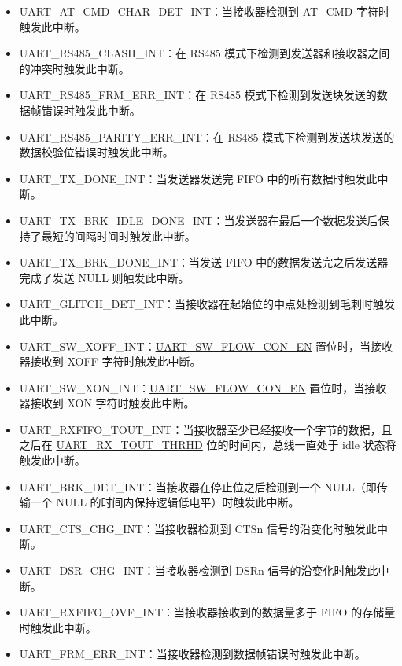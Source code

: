 \documentclass[main\_\_CN.tex]{subfiles}
\begin{document}
\begin{itemize}
\item \label{int:UARTATCMDCHARDETINT}UART\_AT\_CMD\_CHAR\_DET\_INT：当接收器检测到 AT\_CMD 字符时触发此中断。
\item \label{int:UARTRS485CLASHINT}UART\_RS485\_CLASH\_INT：在 RS485 模式下检测到发送器和接收器之间的冲突时触发此中断。
\item \label{int:UARTRS485FRMERRINT}UART\_RS485\_FRM\_ERR\_INT：在 RS485 模式下检测到发送块发送的数据帧错误时触发此中断。
\item \label{int:UARTRS485PARITYERRINT}UART\_RS485\_PARITY\_ERR\_INT：在 RS485 模式下检测到发送块发送的数据校验位错误时触发此中断。
\item \label{int:UARTTXDONEINT}UART\_TX\_DONE\_INT：当发送器发送完 FIFO 中的所有数据时触发此中断。
\item \label{int:UARTTXBRKIDLEDONEINT}UART\_TX\_BRK\_IDLE\_DONE\_INT：当发送器在最后一个数据发送后保持了最短的间隔时间时触发此中断。
\item \label{int:UARTTXBRKDONEINT}UART\_TX\_BRK\_DONE\_INT：当发送 FIFO 中的数据发送完之后发送器完成了发送 NULL 则触发此中断。
\item \label{int:UARTGLITCHDETINT}UART\_GLITCH\_DET\_INT：当接收器在起始位的中点处检测到毛刺时触发此中断。
\item \label{int:UARTSWXOFFINT}UART\_SW\_XOFF\_INT：\hyperref[fielddesc:UARTSWFLOWCONEN]{UART\_SW\_FLOW\_CON\_EN} 置位时，当接收器接收到 XOFF 字符时触发此中断。
\item \label{int:UARTSWXONINT}UART\_SW\_XON\_INT：\hyperref[fielddesc:UARTSWFLOWCONEN]{UART\_SW\_FLOW\_CON\_EN} 置位时，当接收器接收到 XON 字符时触发此中断。
\item \label{int:UARTRXFIFOTOUTINT}UART\_RXFIFO\_TOUT\_INT：当接收器至少已经接收一个字节的数据，且之后在 \hyperref[fielddesc:UARTRXTOUTTHRHD]{UART\_RX\_TOUT\_THRHD} 位的时间内，总线一直处于 idle 状态将触发此中断。
\item \label{int:UARTBRKDETINT}UART\_BRK\_DET\_INT：当接收器在停止位之后检测到一个 NULL（即传输一个 NULL 的时间内保持逻辑低电平）时触发此中断。
\item \label{int:UARTCTSCHGINT}UART\_CTS\_CHG\_INT：当接收器检测到 CTSn 信号的沿变化时触发此中断。
\item \label{int:UARTDSRCHGINT}UART\_DSR\_CHG\_INT：当接收器检测到 DSRn 信号的沿变化时触发此中断。
\item \label{int:UARTRXFIFOOVFINT}UART\_RXFIFO\_OVF\_INT：当接收器接收到的数据量多于 FIFO 的存储量时触发此中断。
\item \label{int:UARTFRMERRINT}UART\_FRM\_ERR\_INT：当接收器检测到数据帧错误时触发此中断。

\end{itemize}
\end{document}
